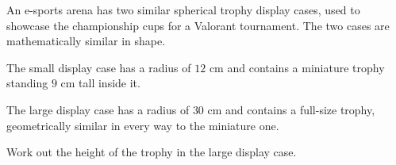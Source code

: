 \begin{question}
\noindent An e-sports arena has two similar spherical trophy display cases, used to showcase the championship cups for a Valorant tournament. The two cases are mathematically similar in shape.

\noindent The small display case has a radius of $12$ cm and contains a miniature trophy standing $9$ cm tall inside it.

\noindent The large display case has a radius of $30$ cm and contains a full-size trophy, geometrically similar in every way to the miniature one.

\noindent Work out the height of the trophy in the large display case.

\vspace{4cm}

\begin{flushright}
\end{flushright}
\end{question}